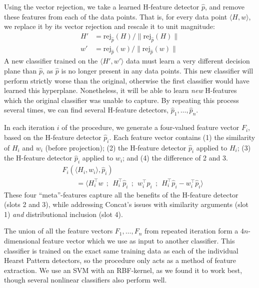 Using the vector rejection, we take a learned H-feature detector $\hat p$,
and remove these features from each of the data points. That is, for every data
point $\langle H, w\rangle$, we replace it by its vector rejection and rescale
it to unit magnitude:
\begin{align*}
  H' & = \text{rej}_{\hat p}(H) / \|\text{rej}_{\hat p}(H)\|\\
  w' & = \text{rej}_{\hat p}(w) / \|\text{rej}_{\hat p}(w)\|
\end{align*}
A new classifier trained on the $\langle H', w'\rangle$ data must learn
a very different decision plane than $\hat p$, as $\hat p$ is no longer present
in any data points. This new classifier will perform strictly worse than the
original, otherwise the first classifier would have learned this hyperplane.
Nonetheless, it will be able to learn {\em new} H-features which the
original classifier was unable to capture. By repeating this process several
times, we can find several H-feature detectors, $\hat p_1, \ldots, \hat p_n$.

In each iteration $i$ of the procedure, we generate a four-valued feature vector
$F_i$, based on the H-feature detector $\hat p_i$. Each
feature vector contains (1) the similarity of $H_i$ and $w_i$ (before projection);
(2) the H-feature detector
$\hat p_i$ applied to $H_i$; (3) the H-feature detector $\hat p_i$ applied to $w_i$; and
(4) the difference of 2 and 3.
\begin{align*}
  & F_i(\langle H_i, w_i\rangle, \hat p_i)\\
  & \qquad = \langle H_i^{\top}w~~;~~H_i^\top\hat p_i~~;~~w_i^\top\hat p_i~~;~~H_i^\top\hat p_i - w_i^\top\hat p_i\rangle
\end{align*}
These four ``meta''-features capture all the benefits of the H-feature
detector (slots 2 and 3), while addressing Concat's issues with
similarity arguments (slot 1) {\em and} distributional inclusion (slot 4).

The union of all the feature vectors $F_1, \ldots, F_n$ from repeated iteration form a
$4n$-dimensional feature vector which we use as input to another classifier.
This classifier is trained on the exact same training data as each of the
individual Hearst Pattern detectors, so the procedure only acts as a method of
feature extraction. We use an SVM with an RBF-kernel, as we found it to work
best, though several nonlinear classifiers also perform well.


